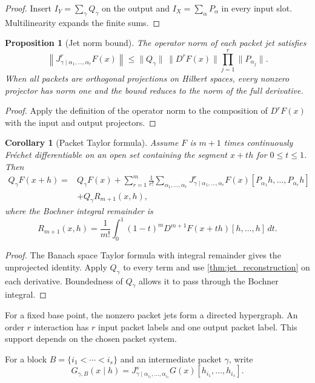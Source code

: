 \documentclass{aomart}
\newtheorem{proposition}[proposition]{Proposition}
\newtheorem{corollary}[corollary]{Corollary}
\theoremstyle{definition}
\theoremstyle{remark}
\begin{document}
\begin{proof}
Insert $I_Y=\sum_\gamma Q_\gamma$ on the output and $I_X=\sum_\alpha P_\alpha$ in every input slot.  Multilinearity expands the finite sums.
\end{proof}

\begin{proposition}[Jet norm bound]\label{prop:jet_norm_bound}
The operator norm of each packet jet satisfies
\[
\left\|J^{r}_{\gamma\mid\alpha_1,\ldots,\alpha_r}F(x)\right\|
\le
\|Q_\gamma\|\,\|D^rF(x)\|
\prod_{j=1}^r\|P_{\alpha_j}\|.
\]
When all packets are orthogonal projections on Hilbert spaces, every nonzero projector has norm one and the bound reduces to the norm of the full derivative.
\end{proposition}

\begin{proof}
Apply the definition of the operator norm to the composition of $D^rF(x)$ with the input and output projectors.
\end{proof}

\begin{corollary}[Packet Taylor formula]\label{cor:packet_taylor}
Assume $F$ is $m+1$ times continuously Fr\'echet differentiable on an open set containing the segment $x+th$ for $0\le t\le1$.  Then
\[
\begin{aligned}
Q_\gamma F(x+h)
={}&Q_\gamma F(x)
+
\sum_{r=1}^{m}\frac1{r!}
\sum_{\alpha_1,\ldots,\alpha_r}
J^{r}_{\gamma\mid\alpha_1,\ldots,\alpha_r}F(x)
[P_{\alpha_1}h,\ldots,P_{\alpha_r}h]\\
&+Q_\gamma R_{m+1}(x,h),
\end{aligned}
\]
where the Bochner integral remainder is
\[
R_{m+1}(x,h)
=
\frac1{m!}
\int_0^1(1-t)^m
D^{m+1}F(x+th)[h,\ldots,h]\,dt.
\]
\end{corollary}

\begin{proof}
The Banach space Taylor formula with integral remainder gives the unprojected identity.  Apply $Q_\gamma$ to every term and use \cref{thm:jet_reconstruction} on each derivative.  Boundedness of $Q_\gamma$ allows it to pass through the Bochner integral.
\end{proof}

For a fixed base point, the nonzero packet jets form a directed hypergraph.  An order $r$ interaction has $r$ input packet labels and one output packet label.  This support depends on the chosen packet system.

For a block $B=\{i_1<\cdots<i_s\}$ and an intermediate packet $\gamma$, write
\[
G_{\gamma,B}(x\mid h)
=
J^s_{\gamma\mid\alpha_{i_1},\ldots,\alpha_{i_s}}G(x)
[h_{i_1},\ldots,h_{i_s}].
\]
\end{document}
